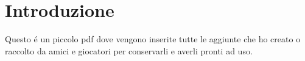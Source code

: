 \chapter{Introduzione}

Questo é un piccolo pdf dove vengono inserite tutte le aggiunte che ho creato o raccolto da amici e giocatori per conservarli e averli pronti ad uso.
